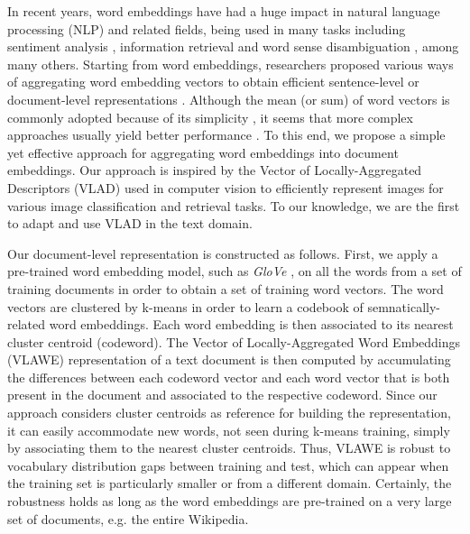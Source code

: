 \documentclass[11pt,a4paper]{article}
\begin{document}
In recent years, word embeddings \cite{Bengio-JMLR-2003,Collobert-ICML-2008,Mikolov-NIPS-2013,Pennington-EMNLP-2014} have had a huge impact in natural language processing (NLP) and related fields, being used in many tasks including sentiment analysis \cite{Dos-COLING-2014,Fu-ESA-2018}, information retrieval \cite{Perronnin-ACL-2013,Ye-ACM-2016} and word sense disambiguation \cite{Bhingardive-NAACL-2015,Butnaru-EACL-2017,Chen-EMNLP-2014,Navigli-ACL-2016}, among many others. Starting from word embeddings, researchers proposed various ways of aggregating word embedding vectors to obtain efficient sentence-level or document-level representations \cite{Ionescu-KES-2017,Cheng-IJCAI-2018,Perronnin-ACL-2013,Conneau-EMNLP-2017,Cozma-ACL-2018,Fu-ESA-2018,Hill-NAACL-2016,Kiros-NIPS-2015,Kusner-ICML-2015,Le-ICML-2014,Shen-ACL-2018,Torki-ACL-2018,Zhao-IJCAI-2015,Zhou-COLING-2016,Zhou-IJCAI-2018}. Although the mean (or sum) of word vectors is commonly adopted because of its simplicity \cite{Mitchell-CS-2010}, it seems that more complex approaches usually yield better performance \cite{Cheng-IJCAI-2018,Conneau-EMNLP-2017,Cozma-ACL-2018,Fu-ESA-2018,Hill-NAACL-2016,Kiros-NIPS-2015,Torki-ACL-2018,Zhao-IJCAI-2015,Zhou-COLING-2016,Zhou-IJCAI-2018}. To this end, we propose a simple yet effective approach for aggregating word embeddings into document embeddings. Our approach is inspired by the Vector of Locally-Aggregated Descriptors (VLAD) \cite{Jegou-CVPR-2010,Jegou-PAMI-2012} used in computer vision to efficiently represent images for various image classification and retrieval tasks. To our knowledge, we are the first to adapt and use VLAD in the text domain.

Our document-level representation is constructed as follows. First, we apply a pre-trained word embedding model, such as \emph{GloVe} \cite{Pennington-EMNLP-2014}, on all the words from a set of training documents in order to obtain a set of training word vectors. The word vectors are clustered by k-means in order to learn a codebook of semnatically-related word embeddings. Each word embedding is then associated to its nearest cluster centroid (codeword). The Vector of Locally-Aggregated Word Embeddings (VLAWE) representation of a text document is then computed by accumulating the differences between each codeword vector and each word vector that is both present in the document and associated to the respective codeword. Since our approach considers cluster centroids as reference for building the representation, it can easily accommodate new words, not seen during k-means training, simply by associating them to the nearest cluster centroids. Thus, VLAWE is robust to vocabulary distribution gaps between training and test, which can appear when the training set is particularly smaller or from a different domain. Certainly, the robustness holds as long as the word embeddings are pre-trained on a very large set of documents, e.g. the entire Wikipedia.
\end{document}

